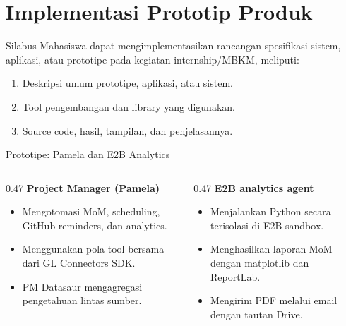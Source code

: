 \section{Implementasi Prototip Produk}

\begin{contentframe}{Silabus}
    \small
    Mahasiswa dapat mengimplementasikan rancangan spesifikasi sistem, aplikasi, atau prototipe pada kegiatan internship/MBKM, meliputi:
    \begin{enumerate}\setlength{\itemsep}{4pt}
        \item Deskripsi umum prototipe, aplikasi, atau sistem.
        \item Tool pengembangan dan library yang digunakan.
        \item Source code, hasil, tampilan, dan penjelasannya.
    \end{enumerate}
\end{contentframe}

\begin{comparisonframe}{Prototipe: Pamela dan E2B Analytics}
    \begin{columns}[T,onlytextwidth]
        \begin{column}{0.47\textwidth}
            \textbf{Project Manager (Pamela)}\par
            \begin{itemize}\setlength{\itemsep}{3pt}
                \item Mengotomasi MoM, scheduling, GitHub reminders, dan analytics.
                \item Menggunakan pola tool bersama dari GL Connectors SDK.
                \item PM Datasaur mengagregasi pengetahuan lintas sumber.
            \end{itemize}
        \end{column}
        \begin{column}{0.47\textwidth}
            \textbf{E2B analytics agent}\par
            \begin{itemize}\setlength{\itemsep}{3pt}
                \item Menjalankan Python secara terisolasi di E2B sandbox.
                \item Menghasilkan laporan MoM dengan matplotlib dan ReportLab.
                \item Mengirim PDF melalui email dengan tautan Drive.
            \end{itemize}
        \end{column}
    \end{columns}
\end{comparisonframe}

